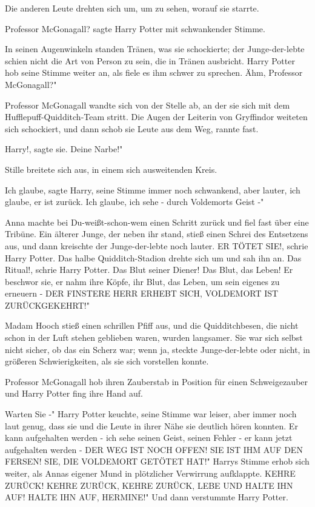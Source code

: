 Die anderen Leute drehten sich um, um zu sehen, worauf sie starrte.

\glqq{}Professor McGonagall?\grqq{} sagte Harry Potter mit schwankender Stimme.

In seinen Augenwinkeln standen Tränen, was sie schockierte; der Junge-der-lebte
schien nicht die Art von Person zu sein, die in Tränen ausbricht. Harry Potter
hob seine Stimme weiter an, als fiele es ihm schwer zu sprechen. \glqq{}Ähm,
Professor McGonagall?"

Professor McGonagall wandte sich von der Stelle ab, an der sie sich mit dem
Hufflepuff-Quidditch-Team stritt. Die Augen der Leiterin von Gryffindor weiteten
sich schockiert, und dann schob sie Leute aus dem Weg, rannte fast.

\glqq{}Harry!\grqq{}, sagte sie. \glqq{}Deine Narbe!"

Stille breitete sich aus, in einem sich ausweitenden Kreis.

\glqq{}Ich glaube\grqq{}, sagte Harry, seine Stimme immer noch schwankend, aber
lauter, \glqq{}ich glaube, er ist zurück. Ich glaube, ich sehe - durch Voldemorts
Geist -"

Anna machte bei Du-weißt-schon-wem einen Schritt zurück und fiel fast über eine
Tribüne. Ein älterer Junge, der neben ihr stand, stieß einen Schrei des
Entsetzens aus, und dann kreischte der Junge-der-lebte noch lauter. \glqq{}ER
TÖTET SIE!\grqq{}, schrie Harry Potter. Das halbe Quidditch-Stadion drehte sich
um und sah ihn an. \glqq{}Das Ritual!\grqq{}, schrie Harry Potter. \glqq{}Das Blut
seiner Diener! Das Blut, das Leben! Er beschwor sie, er nahm ihre Köpfe, ihr
Blut, das Leben, um sein eigenes zu erneuern - DER FINSTERE HERR ERHEBT SICH,
VOLDEMORT IST ZURÜCKGEKEHRT!"

Madam Hooch stieß einen schrillen Pfiff aus, und die Quidditchbesen, die nicht
schon in der Luft stehen geblieben waren, wurden langsamer. Sie war sich selbst
nicht sicher, ob das ein Scherz war; wenn ja, steckte Junge-der-lebte oder
nicht, in größeren Schwierigkeiten, als sie sich vorstellen konnte.

Professor McGonagall hob ihren Zauberstab in Position für einen Schweigezauber
und Harry Potter fing ihre Hand auf.

\glqq{}Warten Sie -" Harry Potter keuchte, seine Stimme war leiser, aber immer
noch laut genug, dass sie und die Leute in ihrer Nähe sie deutlich hören
konnten. \glqq{}Er kann aufgehalten werden - ich sehe seinen Geist, seinen Fehler
- er kann jetzt aufgehalten werden - DER WEG IST NOCH OFFEN! SIE IST IHM AUF DEN
FERSEN! SIE, DIE VOLDEMORT GETÖTET HAT!" Harrys Stimme erhob sich weiter, als
Annas eigener Mund in plötzlicher Verwirrung aufklappte. \glqq{}KEHRE ZURÜCK!
KEHRE ZURÜCK, KEHRE ZURÜCK, LEBE UND HALTE IHN AUF! HALTE IHN AUF, HERMINE!" Und
dann verstummte Harry Potter.

